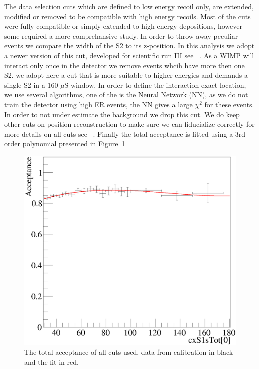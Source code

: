 
The data selection cuts which are defined to low energy recoil only, are extended, modified or removed to be compatible with high energy recoils. Most of the cuts were fully compatible or simply extended to high energy depositions, however some required a more comprehansive study. In order to throw away peculiar events we compare the width of the S2 to its z-position. In this analysis we adopt a newer version of this cut, developed for scientific run III see ~\cite{xe100_run_combination}. As a WIMP will interact only once in the detector we remove events whcih have more then one S2. we adopt here a cut that is more suitable to higher energies and demands a single S2 in a 160 $\mu$S window. In order to define the interaction exact location, we use several algorithms, one of the is the Neural Network (NN), as we do not train the detector using high ER events, the NN gives a large $\chi^2$ for these events. In order to not under estimate the background we drop this cut. We do keep other cuts on position reconstruction to make sure we can fiducialize correctly for more details on all cuts see ~\cite{xe100_ana2012}. Finally the total acceptance is fitted using a 3rd order polynomial presented in Figure~\ref{fig:Acc}

\begin{figure}[h!]
\begin{minipage}{0.9\linewidth}
\centerline{\includegraphics[width=1.\linewidth]{Figures/Acceptance.eps}}
\end{minipage}
\caption{The total acceptance of all cuts used, data from calibration in black and the fit in red.}
\label{fig:Acc}
\end{figure}

